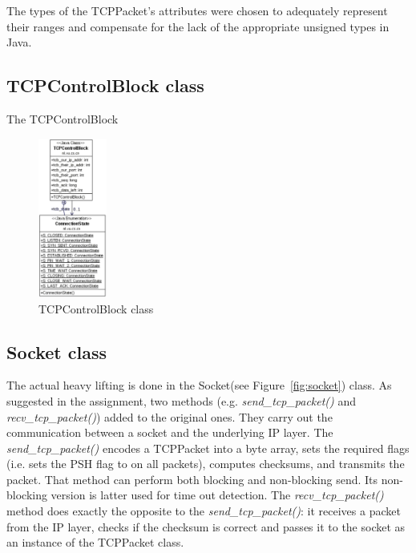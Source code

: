 \documentclass{article}
\begin{document}
\noindent
The types of the TCPPacket's attributes were chosen to adequately represent their ranges and compensate
for the lack of the appropriate unsigned types in Java.
  
\subsection{TCPControlBlock class}
The TCPControlBlock

\begin{figure}[h!]
\centering
\includegraphics[width=0.2\textwidth]{images/control_block}
\caption{TCPControlBlock class}
\label{fig:tcb}
\end{figure}
  
\subsection{Socket class}
The actual heavy lifting is done in the Socket(see Figure~\ref{fig:socket}) class. As suggested in the assignment, two methods 
(e.g. \textit{send\_tcp\_packet()} and \textit{recv\_tcp\_packet()}) added to the original ones. They carry out the communication
between a socket and the underlying IP layer. The \textit{send\_tcp\_packet()} encodes a TCPPacket into a byte array,
sets the required flags (i.e. sets the PSH flag to on all packets), computes checksums, and transmits the
packet. That method can perform both blocking and non-blocking send. Its non-blocking version is latter 
used for time out detection. The \textit{recv\_tcp\_packet()} method does exactly the opposite to the \textit{send\_tcp\_packet()}:
it receives a packet from the IP layer, checks if the checksum is correct and passes it to the socket
as an instance of the TCPPacket class.
\end{document}
